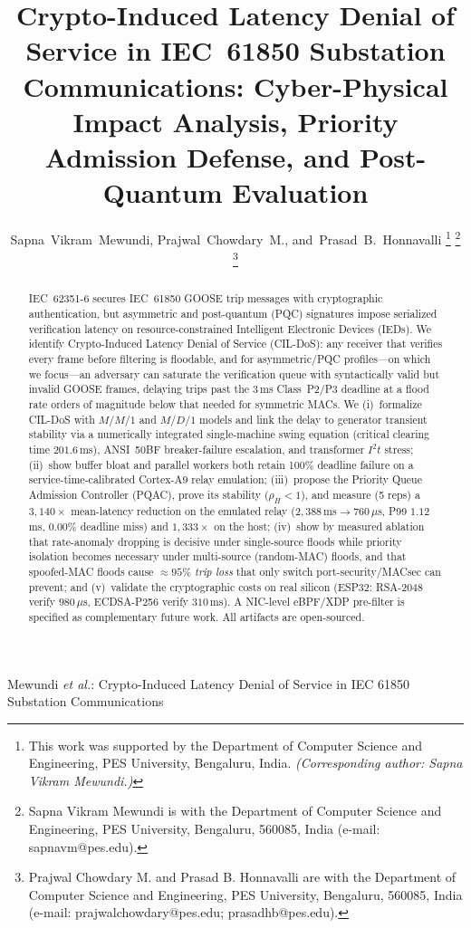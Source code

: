 \documentclass[journal]{IEEEtran}
\begin{document}
\title{Crypto-Induced Latency Denial of Service in IEC~61850 Substation Communications: Cyber-Physical Impact Analysis, Priority Admission Defense, and Post-Quantum Evaluation}

\author{Sapna~Vikram~Mewundi,
        Prajwal~Chowdary~M.,
        and~Prasad~B.~Honnavalli%
\thanks{This work was supported by the Department of Computer Science and Engineering, PES University, Bengaluru, India. \textit{(Corresponding author: Sapna Vikram Mewundi.)}}%
\thanks{Sapna Vikram Mewundi is with the Department of Computer Science and Engineering, PES University, Bengaluru, 560085, India (e-mail: sapnavm@pes.edu).}%
\thanks{Prajwal Chowdary M. and Prasad B. Honnavalli are with the Department of Computer Science and Engineering, PES University, Bengaluru, 560085, India (e-mail: prajwalchowdary@pes.edu; prasadhb@pes.edu).}%
}

%
{Mewundi \MakeLowercase{\textit{et al.}}: Crypto-Induced Latency Denial of Service in IEC 61850 Substation Communications}

\maketitle

\begin{abstract}
IEC~62351-6 secures IEC~61850 GOOSE trip messages with cryptographic authentication, but asymmetric and post-quantum (PQC) signatures impose serialized verification latency on resource-constrained Intelligent Electronic Devices (IEDs). We identify Crypto-Induced Latency Denial of Service (CIL-DoS): any receiver that verifies every frame before filtering is floodable, and for asymmetric/PQC profiles---on which we focus---an adversary can saturate the verification queue with syntactically valid but invalid GOOSE frames, delaying trips past the 3\,ms Class~P2/P3 deadline at a flood rate orders of magnitude below that needed for symmetric MACs. We (i)~formalize CIL-DoS with $M/M/1$ and $M/D/1$ models and link the delay to generator transient stability via a numerically integrated single-machine swing equation (critical clearing time $201.6$\,ms), ANSI~50BF breaker-failure escalation, and transformer $I^2t$ stress; (ii)~show buffer bloat and parallel workers both retain 100\% deadline failure on a service-time-calibrated Cortex-A9 relay emulation; (iii)~propose the Priority Queue Admission Controller (PQAC), prove its stability ($\rho_H<1$), and measure (5 reps) a $3{,}140\times$ mean-latency reduction on the emulated relay ($2{,}388$\,ms$\to$$760\,\mu$s, P99 $1.12$\,ms, $0.00\%$ deadline miss) and $1{,}333\times$ on the host; (iv)~show by measured ablation that rate-anomaly dropping is decisive under single-source floods while priority isolation becomes necessary under multi-source (random-MAC) floods, and that spoofed-MAC floods cause $\approx 95\%$ \emph{trip loss} that only switch port-security/MACsec can prevent; and (v)~validate the cryptographic costs on real silicon (ESP32: RSA-2048 verify $980\,\mu$s, ECDSA-P256 verify $310$\,ms). A NIC-level eBPF/XDP pre-filter is specified as complementary future work. All artifacts are open-sourced.
\end{abstract}
\end{document}
